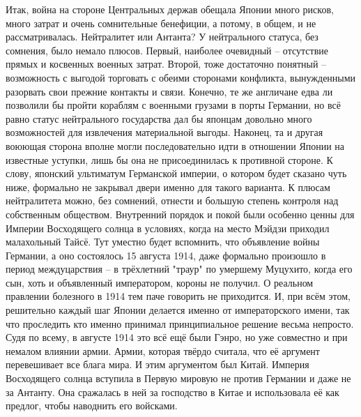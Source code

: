 Итак, война на стороне Центральных держав обещала Японии много рисков, много затрат и очень сомнительные бенефиции, а потому, в общем, и не рассматривалась. Нейтралитет или Антанта? У нейтрального статуса, без сомнения, было немало плюсов. Первый, наиболее очевидный – отсутствие прямых и косвенных военных затрат. Второй, тоже достаточно понятный – возможность с выгодой торговать с обеими сторонами конфликта, вынужденными разорвать свои прежние контакты и связи. Конечно, те же англичане едва ли позволили бы пройти кораблям с военными грузами в порты Германии, но всё равно статус нейтрального государства дал бы японцам довольно много возможностей для извлечения материальной выгоды. Наконец, та и другая воюющая сторона вполне могли последовательно идти в отношении Японии на известные уступки, лишь бы она не присоединилась к противной стороне. К слову, японский ультиматум Германской империи, о котором будет сказано чуть ниже, формально не закрывал двери именно для такого варианта. К плюсам нейтралитета можно, без сомнений, отнести и большую степень контроля над собственным обществом. Внутренний порядок и покой были особенно ценны для Империи Восходящего солнца в условиях, когда на место Мэйдзи приходил малахольный Тайсё. Тут уместно будет вспомнить, что объявление войны Германии, а оно состоялось 15 августа 1914, даже формально произошло в период междуцарствия – в трёхлетний "траур" по умершему Муцухито, когда его сын, хоть и объявленный императором, короны не получил. О реальном правлении болезного в 1914 тем паче говорить не приходится. И, при всём этом, решительно каждый шаг Японии делается именно от императорского имени, так что проследить кто именно принимал принципиальное решение весьма непросто. Судя по всему, в августе 1914 это всё ещё были Гэнро, но уже совместно и при немалом влиянии армии. Армии, которая твёрдо считала, что её аргумент перевешивает все блага мира. И этим аргументом был Китай. Империя Восходящего солнца вступила в Первую мировую не против Германии и даже не за Антанту. Она сражалась в ней за господство в Китае и использовала её как предлог, чтобы наводнить его войсками.

